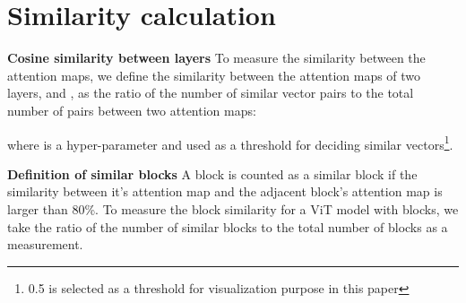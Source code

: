 \documentclass[10pt,twocolumn,letterpaper]{article}
\newcommand{\myPara}[1]{\vspace{.05in}\noindent\textbf{#1}}
\begin{document}
\section{Similarity calculation}

\myPara{Cosine similarity between layers} To measure the similarity between the attention maps, we define the similarity  between the attention maps of two layers,  and , as the ratio of the number of similar vector pairs to the total number of pairs between two attention maps:

where  is a hyper-parameter and used as a threshold for deciding similar vectors\footnote{0.5 is selected as a threshold for visualization purpose in this paper}. 

\myPara{Definition of similar blocks} A block is counted as a similar block if the similarity between it's attention map and the adjacent block's attention map is larger than 80\%. To measure the block similarity for a ViT model with  blocks, we take the ratio of the number of similar blocks to the total number of blocks as a measurement. 

 
\end{document}
